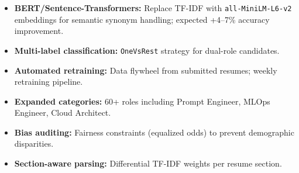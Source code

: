 \documentclass[10pt,twocolumn]{article}
\begin{document}
\begin{itemize}
  \item \textbf{BERT/Sentence-Transformers:} Replace TF-IDF with \texttt{all-MiniLM-L6-v2} embeddings for semantic synonym handling; expected +4--7\% accuracy improvement.
  \item \textbf{Multi-label classification:} \texttt{OneVsRest} strategy for dual-role candidates.
  \item \textbf{Automated retraining:} Data flywheel from submitted resumes; weekly retraining pipeline.
  \item \textbf{Expanded categories:} 60+ roles including Prompt Engineer, MLOps Engineer, Cloud Architect.
  \item \textbf{Bias auditing:} Fairness constraints (equalized odds) to prevent demographic disparities.
  \item \textbf{Section-aware parsing:} Differential TF-IDF weights per resume section.
\end{itemize}

\balance
\end{document}

